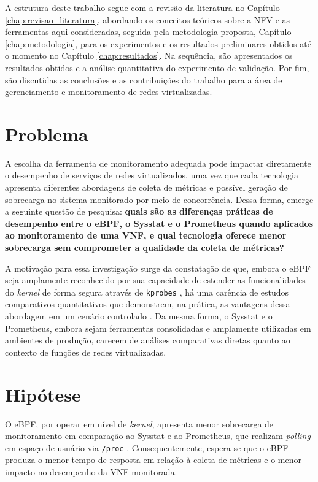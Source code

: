 A estrutura deste trabalho segue com a revisão da literatura no Capítulo \ref{chap:revisao_literatura}, abordando os conceitos teóricos sobre a NFV e as ferramentas aqui consideradas, seguida pela metodologia proposta, Capítulo \ref{chap:metodologia}, para os experimentos e os resultados preliminares obtidos até o momento no Capítulo \ref{chap:resultados}. Na sequência, são apresentados os resultados obtidos e a análise quantitativa do experimento de validação. Por fim, são discutidas as conclusões e as contribuições do trabalho para a área de gerenciamento e monitoramento de redes virtualizadas.


\section{Problema}

A escolha da ferramenta de monitoramento adequada pode impactar diretamente o desempenho de serviços de redes virtualizados, uma vez que cada tecnologia apresenta diferentes abordagens de coleta de métricas e possível geração de sobrecarga no sistema monitorado por meio de concorrência. Dessa forma, emerge a seguinte questão de pesquisa: \textbf{quais são as diferenças práticas de desempenho entre o eBPF, o Sysstat e o Prometheus quando aplicados ao monitoramento de uma VNF, e qual tecnologia oferece menor sobrecarga sem comprometer a qualidade da coleta de métricas?}

A motivação para essa investigação surge da constatação de que, embora o eBPF seja amplamente reconhecido por sua capacidade de estender as funcionalidades do \textit{kernel} de forma segura através de \texttt{kprobes} \cite{bcc_project}, há uma carência de estudos comparativos quantitativos que demonstrem, na prática, as vantagens dessa abordagem em um cenário controlado \cite{usman_observability_2022}. Da mesma forma, o Sysstat e o Prometheus, embora sejam ferramentas consolidadas e amplamente utilizadas em ambientes de produção, carecem de análises comparativas diretas quanto ao contexto de funções de redes virtualizadas.

\section{Hipótese}

O eBPF, por operar em nível de \textit{kernel}, apresenta menor sobrecarga de monitoramento em comparação ao Sysstat e ao Prometheus, que realizam \textit{polling} \cite{rfc9232} em espaço de usuário via \texttt{/proc} \cite{linux_proc_man}. Consequentemente, espera-se que o eBPF produza o menor tempo de resposta em relação à coleta de métricas e o menor impacto no desempenho da VNF monitorada.

